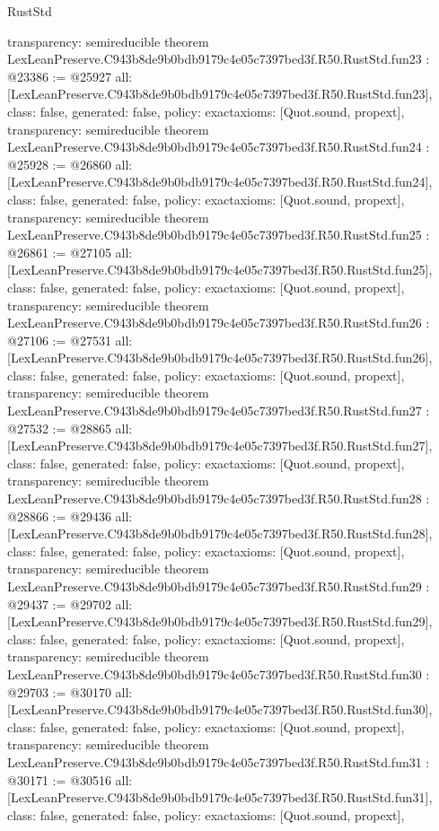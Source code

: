\begin{lexlean}{RustStd}
\begin{coremodule}
{  transparency: semireducible
}
theorem LexLeanPreserve.C943b8de9b0bdb9179c4e05c7397bed3f.R50.RustStd.fun23 : @23386 := @25927 {
  all: [LexLeanPreserve.C943b8de9b0bdb9179c4e05c7397bed3f.R50.RustStd.fun23],
  class: false,
  generated: false,
  policy: exact{axioms: [Quot.sound, propext]},
  transparency: semireducible
}
theorem LexLeanPreserve.C943b8de9b0bdb9179c4e05c7397bed3f.R50.RustStd.fun24 : @25928 := @26860 {
  all: [LexLeanPreserve.C943b8de9b0bdb9179c4e05c7397bed3f.R50.RustStd.fun24],
  class: false,
  generated: false,
  policy: exact{axioms: [Quot.sound, propext]},
  transparency: semireducible
}
theorem LexLeanPreserve.C943b8de9b0bdb9179c4e05c7397bed3f.R50.RustStd.fun25 : @26861 := @27105 {
  all: [LexLeanPreserve.C943b8de9b0bdb9179c4e05c7397bed3f.R50.RustStd.fun25],
  class: false,
  generated: false,
  policy: exact{axioms: [Quot.sound, propext]},
  transparency: semireducible
}
theorem LexLeanPreserve.C943b8de9b0bdb9179c4e05c7397bed3f.R50.RustStd.fun26 : @27106 := @27531 {
  all: [LexLeanPreserve.C943b8de9b0bdb9179c4e05c7397bed3f.R50.RustStd.fun26],
  class: false,
  generated: false,
  policy: exact{axioms: [Quot.sound, propext]},
  transparency: semireducible
}
theorem LexLeanPreserve.C943b8de9b0bdb9179c4e05c7397bed3f.R50.RustStd.fun27 : @27532 := @28865 {
  all: [LexLeanPreserve.C943b8de9b0bdb9179c4e05c7397bed3f.R50.RustStd.fun27],
  class: false,
  generated: false,
  policy: exact{axioms: [Quot.sound, propext]},
  transparency: semireducible
}
theorem LexLeanPreserve.C943b8de9b0bdb9179c4e05c7397bed3f.R50.RustStd.fun28 : @28866 := @29436 {
  all: [LexLeanPreserve.C943b8de9b0bdb9179c4e05c7397bed3f.R50.RustStd.fun28],
  class: false,
  generated: false,
  policy: exact{axioms: [Quot.sound, propext]},
  transparency: semireducible
}
theorem LexLeanPreserve.C943b8de9b0bdb9179c4e05c7397bed3f.R50.RustStd.fun29 : @29437 := @29702 {
  all: [LexLeanPreserve.C943b8de9b0bdb9179c4e05c7397bed3f.R50.RustStd.fun29],
  class: false,
  generated: false,
  policy: exact{axioms: [Quot.sound, propext]},
  transparency: semireducible
}
theorem LexLeanPreserve.C943b8de9b0bdb9179c4e05c7397bed3f.R50.RustStd.fun30 : @29703 := @30170 {
  all: [LexLeanPreserve.C943b8de9b0bdb9179c4e05c7397bed3f.R50.RustStd.fun30],
  class: false,
  generated: false,
  policy: exact{axioms: [Quot.sound, propext]},
  transparency: semireducible
}
theorem LexLeanPreserve.C943b8de9b0bdb9179c4e05c7397bed3f.R50.RustStd.fun31 : @30171 := @30516 {
  all: [LexLeanPreserve.C943b8de9b0bdb9179c4e05c7397bed3f.R50.RustStd.fun31],
  class: false,
  generated: false,
  policy: exact{axioms: [Quot.sound, propext]},
}
\end{coremodule}
\end{lexlean}
